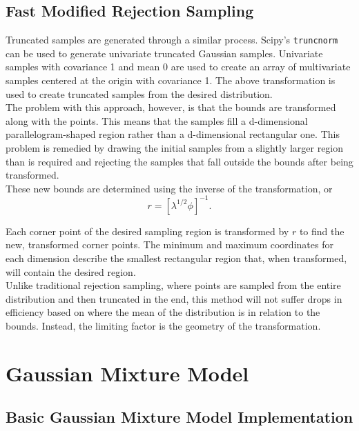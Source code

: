 \documentclass{article}
\begin{document}
\subsection{Fast Modified Rejection Sampling}

Truncated samples are generated through a similar process. Scipy's
\texttt{truncnorm} can be used to generate univariate truncated Gaussian
samples. Univariate samples with covariance 1 and mean 0 are used to create an
array of multivariate samples centered at the origin with covariance 1. The
above transformation is used to create truncated samples from the
desired distribution. \\

The problem with this approach, however, is that the bounds are transformed
along with the points. This means that the samples fill a d-dimensional
parallelogram-shaped region rather than a d-dimensional rectangular one. This
problem is remedied by drawing the initial samples from a slightly larger region
than is required and rejecting the samples that fall outside the bounds after
being transformed. \\

These new bounds are determined using the inverse of the transformation, or
\begin{equation}
    r = [\lambda^{1/2} \phi]^{-1}.
\end{equation}

Each corner point of the desired sampling region is transformed by $r$ to find
the new, transformed corner points.  The minimum and maximum coordinates for
each dimension describe the smallest rectangular region that, when transformed,
will contain the desired region. \\

Unlike traditional rejection sampling, where points are sampled from the entire
distribution and then truncated in the end, this method will not suffer drops in
efficiency based on where the mean of the distribution is in relation to the
bounds. Instead, the limiting factor is the geometry of the transformation.

\section{Gaussian Mixture Model}

\subsection{Basic Gaussian Mixture Model Implementation}
\end{document}
